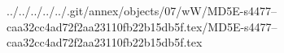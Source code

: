 ../../../../../.git/annex/objects/07/wW/MD5E-s4477--caa32cc4ad72f2aa23110fb22b15db5f.tex/MD5E-s4477--caa32cc4ad72f2aa23110fb22b15db5f.tex